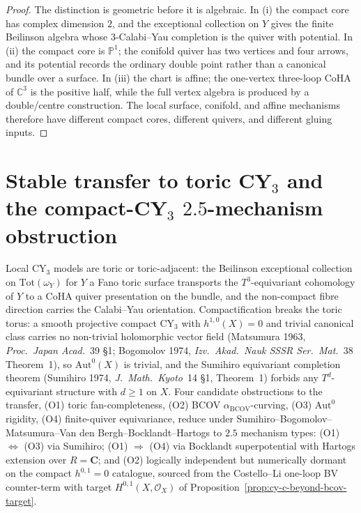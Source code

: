 \begin{proof}
The distinction is geometric before it is algebraic. In \textup{(i)}
the compact core has complex dimension $2$, and the exceptional
collection on $Y$ gives the finite Beilinson algebra whose
$3$-Calabi--Yau completion is the quiver with potential. In
\textup{(ii)} the compact core is $\mathbb P^1$; the conifold quiver
has two vertices and four arrows, and its potential records the
ordinary double point rather than a canonical bundle over a surface.
In \textup{(iii)} the chart is affine; the one-vertex three-loop
CoHA of $\mathbb C^3$ is the positive half, while the full vertex
algebra is produced by a double/centre construction. The local
surface, conifold, and affine mechanisms therefore have different
compact cores, different quivers, and different gluing inputs.
\end{proof}

\section{Stable transfer to toric CY\texorpdfstring{$_3$}{-3} and the compact-CY\texorpdfstring{$_3$}{-3} \texorpdfstring{$2.5$}{2.5}-mechanism obstruction}
\label{sec:cy-c-beyond-stable-transfer-and-compact-obstruction}

Local CY$_3$ models are toric or toric-adjacent: the Beilinson
exceptional collection on $\mathrm{Tot}(\omega_Y)$ for $Y$ a Fano toric
surface transports the $T^3$-equivariant cohomology of $Y$ to a CoHA
quiver presentation on the bundle, and the non-compact fibre direction
carries the Calabi--Yau orientation. Compactification breaks the toric
torus: a smooth projective compact CY$_3$ with $h^{1,0}(X) = 0$ and
trivial canonical class carries no non-trivial holomorphic vector
field (Matsumura 1963, \emph{Proc.\ Japan Acad.}~39 \S 1; Bogomolov
1974, \emph{Izv.\ Akad.\ Nauk SSSR Ser.\ Mat.}~38 Theorem~1), so
$\mathrm{Aut}^0(X)$ is trivial, and the Sumihiro equivariant
completion theorem (Sumihiro 1974, \emph{J.\ Math.\ Kyoto}~14 \S 1,
Theorem~1) forbids any $T^d$-equivariant structure with $d \geq 1$ on
$X$. Four candidate obstructions to the transfer,
(O1) toric fan-completeness, (O2) BCOV $\alpha_{\mathrm{BCOV}}$-curving,
(O3) $\mathrm{Aut}^0$ rigidity, (O4) finite-quiver equivariance, reduce
under Sumihiro--Bogomolov--Matsumura--Van den Bergh--Bocklandt--Hartogs
to $2.5$ mechanism types: (O1) $\Leftrightarrow$ (O3) via
Sumihiro; (O1) $\Rightarrow$ (O4) via Bocklandt superpotential with
Hartogs extension over $R = \mathbf C$; and (O2) logically independent but
numerically dormant on the compact $h^{0,1}=0$ catalogue,
sourced from the Costello--Li one-loop BV counter-term with target
$H^{0,1}(X, \mathcal O_X)$ of Proposition~\ref{prop:cy-c-beyond-bcov-target}.

